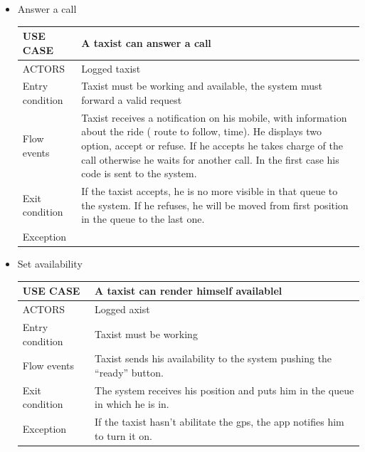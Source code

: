 \begin{itemize}
\begin{center}
\begin{figure} [h]
	\end{figure}
	\end{center}
	\newpage 
\item Answer a call
	\begin{center}
   	 \begin{tabular}{ | l | p{11cm} |}
   	 \hline
   	USE CASE & A taxist can answer a call\\ \hline
   	 ACTORS & Logged taxist \\ \hline
    	 Entry condition & Taxist must be working and available, the system must forward a valid request \\ \hline
    	 Flow events & Taxist receives a notification on his mobile, with information about the ride ( route to follow, time).
He displays two option, accept or refuse. If he accepts he takes charge of the call otherwise he waits for another call. In the first case his code is sent to the system.\\ \hline
  	   Exit condition & If the taxist accepts, he is no more visible in that queue to the system.
If he refuses, he will be moved from first position in the queue to the last one.\\ \hline
  	   Exception &  \\ \hline
    \end{tabular}
\end{center}
\item Set availability
	\begin{center}
   	 \begin{tabular}{ | l | p{11cm} |}
   	 \hline
   	USE CASE & A taxist can render himself availablel\\ \hline
   	 ACTORS & Logged axist \\ \hline
    	 Entry condition & Taxist must be working \\ \hline
    	 Flow events & Taxist sends his availability to the system pushing the “ready” button.\\ \hline
  	   Exit condition & The system receives his position and puts him in the queue in which he is in.\\ \hline
  	   Exception &  If the taxist hasn’t abilitate the gps, the app notifies him to turn it on.\\ \hline
    \end{tabular}
\end{center}



\end{itemize}
